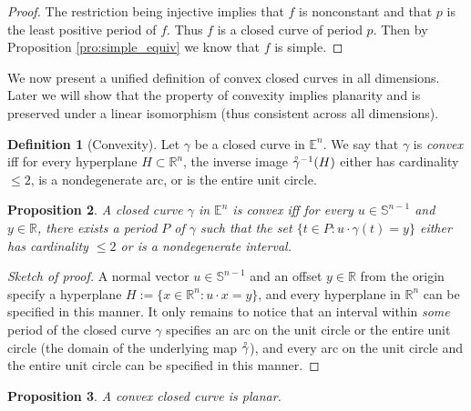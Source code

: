 \documentclass{amsart}
\newtheorem{proposition}{Proposition}[section]
\theoremstyle{definition}
\newtheorem{definition}[proposition]{Definition}
\theoremstyle{remark}
\newcommand{\lring}[1]{\accentset{\circ}{#1}}
\begin{document}
\begin{proof}
    The restriction being injective implies that
    $f$ is nonconstant and that $p$ is the least positive
    period of $f$. Thus $f$ is a closed curve of period $p$.
    Then by Proposition \ref{pro:simple_equiv}
    we know that $f$ is simple.
\end{proof}

We now present a unified definition of convex closed curves in
all dimensions. Later we will show that the property of convexity
implies planarity and is preserved under a linear isomorphism
(thus consistent across all dimensions).

\begin{definition}[Convexity]
    Let $\gamma$ be a closed curve in $\mathbb{E}^n$.
    We say that $\gamma$ is \emph{convex} iff
    for every hyperplane $H\subset\mathbb{R}^n$,
    the inverse image $\lring{\gamma}^{-1}(H)$ either
    has cardinality $\le2$, is a nondegenerate arc,
    or is the entire unit circle.
\end{definition}

\begin{proposition}
    \label{pro:convex_equiv}
    A closed curve $\gamma$ in $\mathbb{E}^n$ is convex
    iff for every $u\in\mathbb{S}^{n-1}$ and $y\in\mathbb{R}$,
    there exists a period $P$ of $\gamma$ such that
    the set $\{t\in P:u\cdot\gamma(t)=y\}$ either
    has cardinality $\le2$ or is a nondegenerate interval.
\end{proposition}

\begin{proof}[Sketch of proof]
    A normal vector $u\in\mathbb{S}^{n-1}$ and
    an offset $y\in\mathbb{R}$ from the origin specify
    a hyperplane $H:=\{x\in\mathbb{R}^n:u\cdot x=y\}$, and
    every hyperplane in $\mathbb{R}^n$ can be specified in this manner.
    It only remains to notice that
    an interval within \emph{some} period of the closed curve $\gamma$
    specifies an arc on the unit circle or the entire unit circle
    (the domain of the underlying map $\lring{\gamma}$),
    and every arc on the unit circle and the entire unit circle
    can be specified in this manner.
\end{proof}

\begin{proposition}
    \label{pro:convex_planar}
    A convex closed curve is planar.
\end{proposition}
\end{document}
